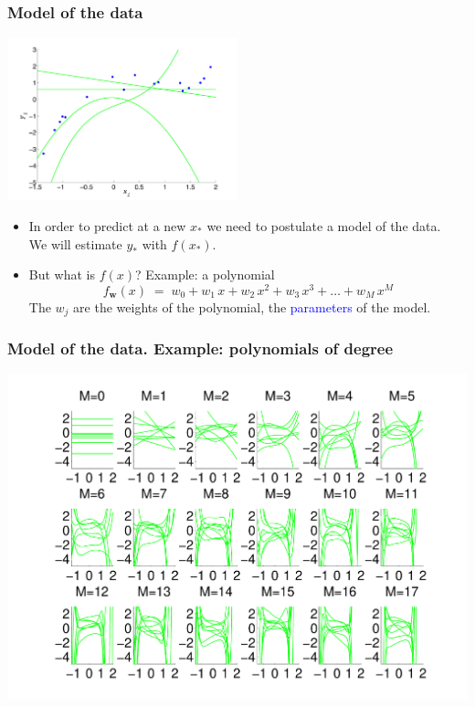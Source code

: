 \documentclass[10pt]{beamer}
\newcommand{\Blue}{\textcolor{blue}}
\newcommand{\bfw}{\mathbf w}
\begin{document}
\begin{frame}
\frametitle{Model of the data}

\centerline{\includegraphics[width=0.5\textwidth]{few_random_polynomials.pdf}}

\vfill

\begin{itemize}
\item In order to predict at a new $x_*$ we need to postulate a model of the data.\\
We will estimate $y_*$ with $f(x_*)$.
\item But what is $f(x)$? Example: a polynomial
%
\[
f_\bfw(x)\;=\; w_0 + w_1\,x + w_2\,x^2 + w_3\,x^3 + \ldots + w_M\,x^M
\]
%
The $w_j$ are the weights of the polynomial, the \Blue{parameters} of the model.
\end{itemize}


\end{frame}
\begin{frame}
\frametitle{Model of the data. Example: polynomials of degree }

\centerline{\includegraphics[width=\textwidth]{random_polynomials.pdf}}

\end{frame}
\end{document}
